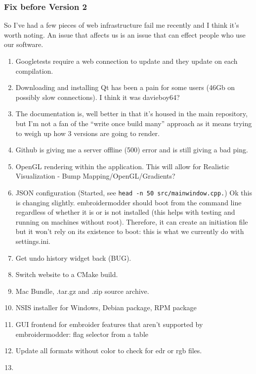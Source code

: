 \hypertarget{fix-before-version-2}{%
\subsubsection{Fix before Version 2}\label{fix-before-version-2}}

So I've had a few pieces of web infrastructure fail me recently and I
think it's worth noting. An issue that affects us is an issue that can
effect people who use our software.

\begin{enumerate}
\def\labelenumi{\arabic{enumi}.}
\tightlist
\item
  Googletests require a web connection to update and they update on each
  compilation.
\item
  Downloading and installing Qt has been a pain for some users (46Gb on
  possibly slow connections). I think it was davieboy64?
\item
  The documentation is, well better in that it's housed in the main
  repository, but I'm not a fan of the ``write once build many''
  approach as it means trying to weigh up how 3 versions are going to
  render.
\item
  Github is giving me a server offline (500) error and is still giving a
  bad ping.
\item
  OpenGL rendering within the application. This will allow for Realistic
  Visualization - Bump Mapping/OpenGL/Gradients?
\item
  JSON configuration (Started, see
  \texttt{head\ -n\ 50\ src/mainwindow.cpp.}) Ok this is changing
  slightly. embroidermodder should boot from the command line regardless
  of whether it is or is not installed (this helps with testing and
  running on machines without root). Therefore, it can create an
  initiation file but it won't rely on its existence to boot: this is
  what we currently do with settings.ini.
\item
  Get undo history widget back (BUG).
\item
  Switch website to a CMake build.
\item
  Mac Bundle, .tar.gz and .zip source archive.
\item
  NSIS installer for Windows, Debian package, RPM package
\item
  GUI frontend for embroider features that aren't supported by
  embroidermodder: flag selector from a table
\item
  Update all formats without color to check for edr or rgb files.
\item

\end{enumerate}
